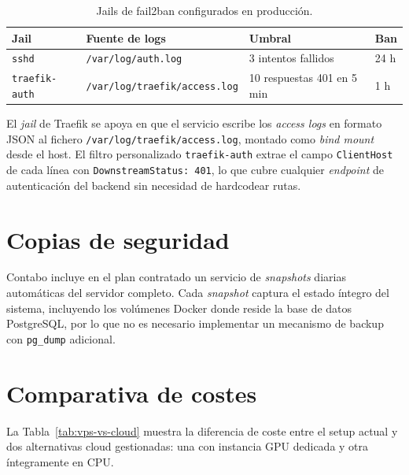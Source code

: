 \begin{table}[h]
\centering
\caption{Jails de fail2ban configurados en producción.}
\label{tab:fail2ban-jails}
\begin{tabular}{llll}
\hline
\textbf{Jail} & \textbf{Fuente de logs} & \textbf{Umbral} & \textbf{Ban} \\
\hline
\texttt{sshd}         & \texttt{/var/log/auth.log}            & 3 intentos fallidos    & 24 h \\
\texttt{traefik-auth} & \texttt{/var/log/traefik/access.log}  & 10 respuestas 401 en 5 min & 1 h  \\
\hline
\end{tabular}
\end{table}

El \emph{jail} de Traefik se apoya en que el servicio escribe los \emph{access logs} en formato JSON al fichero \texttt{/var/log/traefik/access.log}, montado como \emph{bind mount} desde el host. El filtro personalizado \texttt{traefik-auth} extrae el campo \texttt{ClientHost} de cada línea con \texttt{DownstreamStatus: 401}, lo que cubre cualquier \emph{endpoint} de autenticación del backend sin necesidad de hardcodear rutas.

\section{Copias de seguridad}

Contabo incluye en el plan contratado un servicio de \emph{snapshots} diarias automáticas del servidor completo. Cada \emph{snapshot} captura el estado íntegro del sistema, incluyendo los volúmenes Docker donde reside la base de datos PostgreSQL, por lo que no es necesario implementar un mecanismo de backup con \texttt{pg\_dump} adicional.

\section{Comparativa de costes}

La Tabla~\ref{tab:vps-vs-cloud} muestra la diferencia de coste entre el setup actual y dos alternativas cloud gestionadas: una con instancia GPU dedicada y otra íntegramente en CPU.

